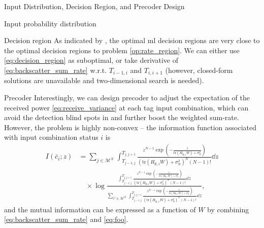 \documentclass[journal]{IEEEtran}
\newtheorem{theorem}{Theorem}
\begin{document}
\begin{section}{Input Distribution, Decision Region, and Precoder Design}
\begin{subsection}{Input probability distribution}
		\end{subsection}


		\begin{subsection}{Decision region}
			As indicated by \cite{Qian2019b}, the optimal \gls{ml} decision regions are very close to the optimal decision regions to problem \eqref{op:rate_region}. We can either use \eqref{eq:decision_region} as suboptimal, or take derivative of \eqref{eq:backscatter_sum_rate} w.r.t. $T_{i-1,i}$ and $T_{i,i+1}$ (however, closed-form solutions are unavailable and two-dimensional search is needed).
		\end{subsection}

		\begin{subsection}{Precoder}
			Interestingly, we can design precoder to adjust the expectation of the received power \eqref{eq:receive_variance} at each tag input combination, which can avoid the detection blind spots in \cite{Qian2019} and further boost the weighted sum-rate. However, the problem is highly non-convex -- the information function associated with input combination status $i$ is
			\begin{align}
				I(\bar{c}_i;z)
				& = \sum_{j \in \mathcal{M^K}} \int_{T_{j-1,j}}^{T_{j,j+1}} \frac{z^{N-1} \exp \left(-\frac{z}{\mathrm{tr}(H_{\mathrm{E},i} W) + \sigma_w^2}\right)}{\left(\mathrm{tr}(H_{\mathrm{E},i} W) + \sigma_w^2\right)^N (N-1)!} \dd z\nonumber\\
				& \quad \times \log \frac{\int_{T_{j-1,j}}^{T_{j,j+1}} \frac{z^{N-1} \exp \left(-\frac{z}{\mathrm{tr}(H_{\mathrm{E},i} W) + \sigma_w^2}\right)}{\left(\mathrm{tr}(H_{\mathrm{E},i} W) + \sigma_w^2\right)^N (N-1)!} \dd z}{\sum_{i' \in \mathcal{M^K}} \int_{T_{j-1,j}}^{T_{j,j+1}} \frac{z^{N-1} \exp \left(-\frac{z}{\mathrm{tr}(H_{\mathrm{E},i'} W) + \sigma_w^2}\right)}{\left(\mathrm{tr}(H_{\mathrm{E},i'} W) + \sigma_w^2\right)^N (N-1)!} \dd z},
				\label{eq:foo}
			\end{align}
			and the mutual information can be expressed as a function of $W$ by combining \eqref{eq:backscatter_sum_rate} and \eqref{eq:foo}.


\end{subsection}
\end{section}
\end{document}
